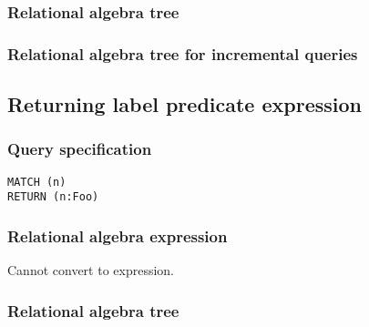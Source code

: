 \subsubsection*{Relational algebra tree}


\subsubsection*{Relational algebra tree for incremental queries}


\subsection{Returning label predicate expression}

\subsubsection*{Query specification}

\begin{lstlisting}
MATCH (n)
RETURN (n:Foo)
\end{lstlisting}

\subsubsection*{Relational algebra expression}

Cannot convert to expression.

\subsubsection*{Relational algebra tree}

